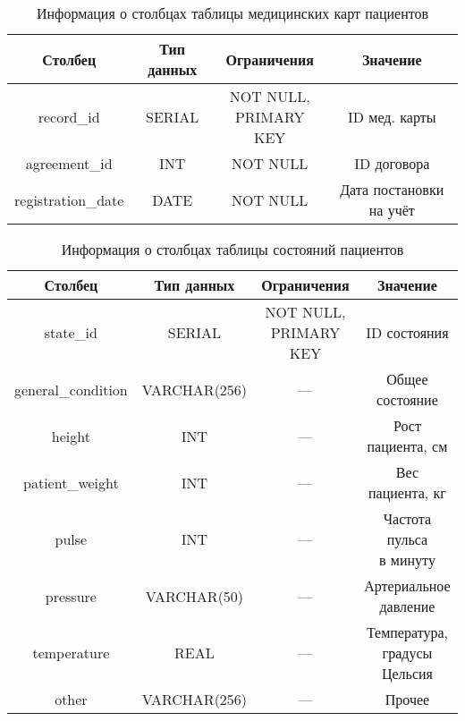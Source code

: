\begin{table}[H]
\begin{center}
	\captionsetup{justification=raggedright,singlelinecheck=off,margin=5mm}
	\caption{Информация о столбцах таблицы медицинских карт пациентов}
	\begin{tabular}{| c | c | c | c |}
		\hline
		Столбец & Тип данных & Ограничения & Значение \\
		\hline
		record\_id & SERIAL & \makecell{NOT NULL, \\ PRIMARY KEY} & ID мед. карты \\
		\hline
		agreement\_id & INT & NOT NULL & ID договора \\
		\hline
		registration\_date & DATE & NOT NULL & Дата постановки на учёт\\
		\hline
	\end{tabular}
	\label{table:records-columns}
\end{center}
\end{table}

\begin{table}[H]
\begin{center}
	\captionsetup{justification=raggedright,singlelinecheck=off,margin=5mm}
	\caption{Информация о столбцах таблицы состояний пациентов}
	\begin{tabular}{| c | c | c | c |}
		\hline
		Столбец & Тип данных & Ограничения & Значение \\
		\hline
		state\_id & SERIAL & \makecell{NOT NULL, \\ PRIMARY KEY} & ID состояния \\
		\hline
		general\_condition & VARCHAR(256) & --- & Общее состояние \\
		\hline
		height & INT &  --- & Рост пациента, см\\
		\hline
		patient\_weight &  INT &  --- & Вес пациента, кг\\
		\hline
		pulse & INT & --- & \makecell{Частота пульса \\в минуту}\\
		\hline
		pressure & VARCHAR(50) & --- & \makecell{Артериальное \\давление }\\
		\hline
		temperature & REAL & --- & \makecell{Температура, \\градусы Цельсия} \\
		\hline
		other & VARCHAR(256) & --- & Прочее \\
		\hline
	\end{tabular}
	\label{table:states-columns}
\end{center}
\end{table}

